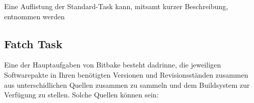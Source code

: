 Eine Auflistung der Standard-Task kann, mitsamt kurzer Beschreibung,
entnommen werden
\cite[S. 171-172]{Gonzalez2018:Embedded_Linux_Development_Using_Yocto_Project_Cookbook_2nd}

\subsection{Fatch Task}%
\label{sub:fatch_task}
Eine der Hauptaufgaben von Bitbake besteht dadrinne, die jeweiligen
Softwarepakte in Ihren benötigten Versionen und Revisionsständen zusammen aus
unterschidlichen Quellen zusammen zu sammeln und dem Buildsystem zur Verfügung
zu stellen. Solche Quellen können sein:

%
%
%
%
%
%
%
%
